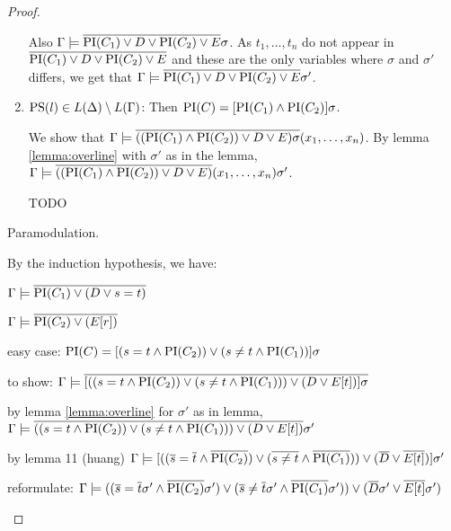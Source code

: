 \begin{proof}
\begin{description}
\begin{enumerate}
					Also
					$\Gamma \models \overline{\mathrm{PI}(C_1) \lor D \lor \mathrm{PI}(C_2) \lor E}\sigma$.
					As $ t_1, \ldots, t_n $ do not appear in $\overline{\mathrm{PI}(C_1) \lor D \lor \mathrm{PI}(C_2) \lor E}$ and these are the only variables where $\sigma$ and $\sigma'$ differs, we get that 
					$\Gamma \models \overline{\mathrm{PI}(C_1) \lor D \lor \mathrm{PI}(C_2) \lor E}\sigma'$.


				\item $\mathrm{PS}(l) \in L(\Delta) \setminus L(\Gamma)$:
					Then $\mathrm{PI}(C) = [\mathrm{PI}(C_1) \land \mathrm{PI}(C_2)]\sigma$. 

					We show that $\Gamma \models \overline{((\mathrm{PI}(C_1) \land \mathrm{PI}(C_2)) \lor D \lor E)\sigma}(x_1, \ldots, x_n) $.
					By lemma \ref{lemma:overline} with $\sigma'$ as in the lemma,
					$\Gamma \models \overline{((\mathrm{PI}(C_1) \land \mathrm{PI}(C_2)) \lor D \lor E)}(x_1, \ldots, x_n) \sigma'$.

					TODO


			\end{enumerate}

		\item{Paramodulation.}

			\begin{prooftree}
			\end{prooftree}

			By the induction hypothesis, we have:

			$\Gamma \models \overline{\mathrm{PI}(C_1) \lor (D\lor s=t)}$

			$\Gamma \models \overline{\mathrm{PI}(C_2) \lor (E[r])}$



	easy case:
			$\mathrm{PI}(C) = [ ( s=t \land \mathrm{PI}(C_2) ) \lor (s\neq t \land \mathrm{PI}(C_1)) ]\sigma$

			to show:
			$\Gamma \models \overline{ [ (( s=t \land \mathrm{PI}(C_2) ) \lor (s\neq t \land \mathrm{PI}(C_1))) \lor (D \lor E[t]) ]\sigma} $

			by lemma \ref{lemma:overline} for $\sigma'$ as in lemma, 
			$\Gamma \models \overline{ (( s=t \land \mathrm{PI}(C_2) ) \lor (s\neq t \land \mathrm{PI}(C_1))) \lor (D \lor E[t]) }\sigma' $

			by lemma 11 (huang)
			$\Gamma \models [((\overline{s}=\overline{t} \land \overline{\mathrm{PI}(C_2)} ) \lor (\overline{s\neq t} \land \overline{\mathrm{PI}(C_1)})) \lor (\overline{D} \lor \overline{E[t]}) ]\sigma' $

			reformulate:
			$\Gamma \models ((\overline{s}=\overline{t}\sigma' \land \overline{\mathrm{PI}(C_2)}\sigma' ) \lor (\overline{s}\neq \overline{t}\sigma' \land \overline{\mathrm{PI}(C_1)}\sigma')) \lor (\overline{D}\sigma' \lor \overline{E[t]}\sigma') $


\end{description}
\end{proof}

